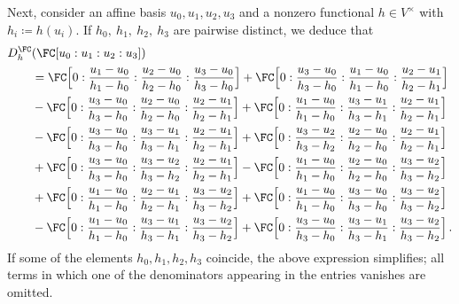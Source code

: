 \documentclass[a4paper]{amsart}
\begin{document}
Next, consider an affine basis $u_0, u_1, u_2, u_3$ and a nonzero functional $h\in V^{\times}$ with  $h_i \coloneq h(u_i)$. If $h_0,\ h_1,\ h_2,\ h_3$ are pairwise distinct, we deduce that
\begin{align*}
D^\FC_h  &(\FC[u_0:u_1:u_2:u_3]) \\  
&=\FC\Bigl[0:\frac{u_1-u_0}{h_1-h_0} :\frac{u_2-u_0}{h_2-h_0} : \frac{u_3-u_0}{h_3-h_0}\Bigr]
+\FC\Bigl[0:\frac{u_3-u_0}{h_3-h_0}: \frac{u_1-u_0}{h_1-h_0}:\frac{u_2-u_1}{h_2-h_1}\Bigr]\\
&-\FC\Bigl[0:\frac{u_3-u_0}{h_3-h_0}: \frac{u_2-u_0}{h_2-h_0} : \frac{u_2-u_1}{h_2-h_1}\Bigr]
+\FC\Bigl[0:\frac{u_1-u_0}{h_1-h_0} : \frac{u_3-u_1}{h_3-h_1} : \frac{u_2-u_1}{h_2-h_1}\Bigr]\\
 &-\FC\Bigl[0:\frac{u_3-u_0}{h_3-h_0} : \frac{u_3-u_1}{h_3-h_1} : \frac{u_2-u_1}{h_2-h_1}\Bigr]
 +\FC\Bigl[0:\frac{u_3-u_2}{h_3-h_2} : \frac{u_2-u_0}{h_2-h_0} : \frac{u_2-u_1}{h_2-h_1}\Bigl]\\
& +\FC\Bigl[0:\frac{u_3-u_0}{h_3-h_0} : \frac{u_3-u_2}{h_3-h_2} : \frac{u_2-u_1}{h_2-h_1}\Bigr]
 -\FC\Bigl[0:\frac{u_1-u_0}{h_1-h_0} :\frac{u_2-u_0}{h_2-h_0} : \frac{u_3-u_2}{h_3-h_2}\Bigr]\\
 &+\FC\Bigl[0:\frac{u_1-u_0}{h_1-h_0} : \frac{u_2-u_1}{h_2-h_1} : \frac{u_3-u_2}{h_3-h_2}\Bigr]
 +\FC\Bigl[0:\frac{u_1-u_0}{h_1-h_0} : \frac{u_3-u_0}{h_3-h_0} : \frac{u_3-u_2}{h_3-h_2}\Bigr]\\
 &-\FC\Bigl[0:\frac{u_1-u_0}{h_1-h_0} : \frac{u_3-u_1}{h_3-h_1} : \frac{u_3-u_2}{h_3-h_2}\Bigr]
+\FC\Bigl[0:\frac{u_3-u_0}{h_3-h_0} : \frac{u_3-u_1}{h_3-h_1} : \frac{u_3-u_2}{h_3-h_2}\Bigr]\,.
\end{align*}
If some of the elements $h_0, h_1, h_2, h_3$ coincide, the above expression simplifies; all terms in which one of the denominators appearing in the entries vanishes are omitted.
\end{document}
